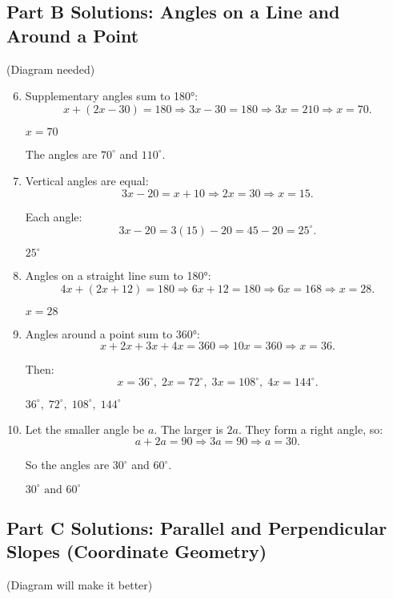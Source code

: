 \documentclass[12pt]{article}
\begin{document}
\subsection*{Part B Solutions: Angles on a Line and Around a Point}
(Diagram needed)

\begin{enumerate}
  \setcounter{enumi}{5}
  \item Supplementary angles sum to 180°:
  \[
  x + (2x - 30) = 180
  \Rightarrow 3x - 30 = 180
  \Rightarrow 3x = 210
  \Rightarrow x = 70.
  \]

  \(\boxed{x = 70}\)

  The angles are \(70^\circ\) and \(110^\circ.\)

  \item Vertical angles are equal:
  \[
  3x - 20 = x + 10
  \Rightarrow 2x = 30
  \Rightarrow x = 15.
  \]

  Each angle:
  \[
  3x - 20 = 3(15) - 20 = 45 - 20 = 25^\circ.
  \]

  \(\boxed{25^\circ}\)

  \item Angles on a straight line sum to 180°:
  \[
  4x + (2x + 12) = 180
  \Rightarrow 6x + 12 = 180
  \Rightarrow 6x = 168
  \Rightarrow x = 28.
  \]

  \(\boxed{x = 28}\)

  \item Angles around a point sum to 360°:
  \[
  x + 2x + 3x + 4x = 360
  \Rightarrow 10x = 360
  \Rightarrow x = 36.
  \]

  Then:
  \[
  x = 36^\circ,\;
  2x = 72^\circ,\;
  3x = 108^\circ,\;
  4x = 144^\circ.
  \]

  \(\boxed{36^\circ,\;72^\circ,\;108^\circ,\;144^\circ}\)

  \item Let the smaller angle be \(a.\) The larger is \(2a.\)  
  They form a right angle, so:
  \[
  a + 2a = 90
  \Rightarrow 3a = 90
  \Rightarrow a = 30.
  \]

  So the angles are \(30^\circ\) and \(60^\circ.\)

  \(\boxed{30^\circ \text{ and } 60^\circ}\)
\end{enumerate}

\subsection*{Part C Solutions: Parallel and Perpendicular Slopes (Coordinate Geometry)}
(Diagram will make it better)
\end{document}
